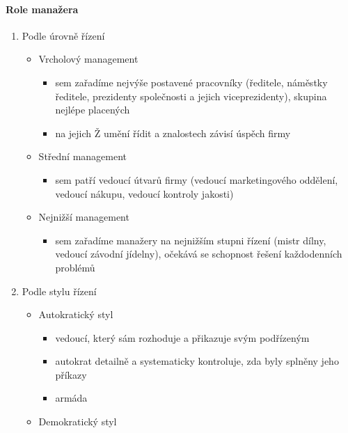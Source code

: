 \paragraph{Role manažera}
\begin{enumerate}
    \item Podle úrovně řízení
        \begin{itemize}
            \item Vrcholový management
                \begin{itemize}
                    \item sem zařadíme nejvýše postavené pracovníky (ředitele, náměstky ředitele, prezidenty společnosti a jejich viceprezidenty), skupina nejlépe placených
                    \item na jejich Ž umění řídit a znalostech závisí úspěch firmy
                \end{itemize}
            \item Střední management
                \begin{itemize}
                    \item sem patří vedoucí útvarů firmy (vedoucí marketingového oddělení, vedoucí nákupu, vedoucí kontroly jakosti)
                \end{itemize}
            \item Nejnižší management
                \begin{itemize}
                    \item sem zařadíme manažery na nejnižším stupni řízení (mistr dílny, vedoucí závodní jídelny), očekává se schopnost řešení každodenních problémů
                \end{itemize}
        \end{itemize}
    \item Podle stylu řízení
        \begin{itemize}
            \item Autokratický styl
                \begin{itemize}
                    \item vedoucí, který sám rozhoduje a přikazuje svým podřízeným
                    \item autokrat detailně a systematicky kontroluje, zda byly splněny jeho příkazy
                    \item armáda
                \end{itemize}
            \item Demokratický styl
                \begin{itemize}

\end{itemize}
\end{itemize}
\end{enumerate}
